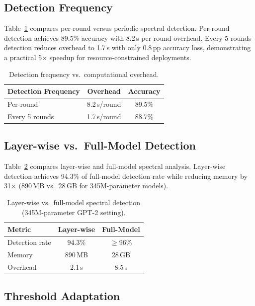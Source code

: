 \subsection{Detection Frequency}

Table~\ref{tab:detection_frequency} compares per-round versus periodic spectral detection.
Per-round detection achieves 89.5\% accuracy with 8.2\,s per-round overhead.
Every-5-rounds detection reduces overhead to 1.7\,s with only 0.8\,pp accuracy loss,
demonstrating a practical 5$\times$ speedup for resource-constrained deployments.

\begin{table}[htbp]
\centering
\caption{Detection frequency vs.\ computational overhead.}
\label{tab:detection_frequency}
\begin{tabular}{|l|c|c|}
\hline
\textbf{Detection Frequency} & \textbf{Overhead} & \textbf{Accuracy} \\
\hline
Per-round & 8.2\,s/round & 89.5\% \\
Every 5 rounds & 1.7\,s/round & 88.7\% \\
\hline
\end{tabular}
\end{table}

\subsection{Layer-wise vs.\ Full-Model Detection}

Table~\ref{tab:layerwise_comparison} compares layer-wise and full-model spectral analysis.
Layer-wise detection achieves 94.3\% of full-model detection rate while reducing memory
by 31$\times$ (890\,MB vs.\ 28\,GB for 345M-parameter models).

\begin{table}[htbp]
\centering
\caption{Layer-wise vs.\ full-model spectral detection (345M-parameter GPT-2 setting).}
\label{tab:layerwise_comparison}
\begin{tabular}{|l|c|c|}
\hline
\textbf{Metric} & \textbf{Layer-wise} & \textbf{Full-Model} \\
\hline
Detection rate & 94.3\% & $\geq$96\% \\
Memory & 890\,MB & 28\,GB \\
Overhead & 2.1\,s & 8.5\,s \\
\hline
\end{tabular}
\end{table}

\subsection{Threshold Adaptation}

